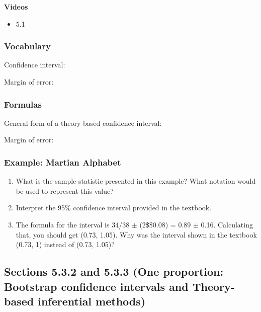 \documentclass[
]{report}
\providecommand{\tightlist}{%
  \setlength{\itemsep}{0pt}\setlength{\parskip}{0pt}}
\newcommand{\rgs}{\vspace{12pt}} %
\begin{document}
\textbf{Videos}

\begin{itemize}
\tightlist
\item
  5.1
\end{itemize}


\hypertarget{vocabulary-13}{%
\subsubsection*{Vocabulary}\label{vocabulary-13}}

Confidence interval:
\rgs

Margin of error:
\rgs

\hypertarget{formulas-3}{%
\subsubsection*{Formulas}\label{formulas-3}}

General form of a theory-based confidence interval:
\rgs

Margin of error:
\rgs

\hypertarget{example-martian-alphabet-1}{%
\subsubsection*{Example: Martian Alphabet}\label{example-martian-alphabet-1}}

\begin{enumerate}
\def\labelenumi{\arabic{enumi}.}
\item
  What is the sample statistic presented in this example? What notation would be used to represent this value?
  \rgs
\item
  Interpret the 95\% confidence interval provided in the textbook.
  \rgs
  \rgs
\item
  The formula for the interval is 34/38 \(\pm\) (2\$\times\$0.08) = 0.89 \(\pm\) 0.16. Calculating that, you should get (0.73, 1.05). Why was the interval shown in the textbook (0.73, 1) instead of (0.73, 1.05)?
  \rgs
\end{enumerate}

\hypertarget{sections-5.3.2-and-5.3.3-one-proportion-bootstrap-confidence-intervals-and-theory-based-inferential-methods}{%
\subsection*{Sections 5.3.2 and 5.3.3 (One proportion: Bootstrap confidence intervals and Theory-based inferential methods)}\label{sections-5.3.2-and-5.3.3-one-proportion-bootstrap-confidence-intervals-and-theory-based-inferential-methods}}
\end{document}
